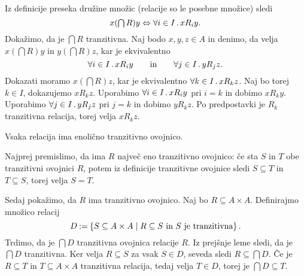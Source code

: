 \begin{dokaz}
  Iz definicije preseka družine množic (relacije so le posebne množice) sledi
  \begin{equation*}
  x (\textstyle\bigcap R) y \Leftrightarrow \forall i \in I \,.\, x R_i y.
  \end{equation*}
  Dokažimo, da je $\textstyle\bigcap R$ tranzitivna.
  Naj bodo $x, y, z \in A$ in denimo, da velja
  $x (\textstyle\bigcap R) y$ in $y (\textstyle\bigcap R) z$, kar je ekvivalentno
  \begin{equation*}
    \forall i \in I \,.\, x R_i y
    \qquad\text{in}\qquad
    \forall j \in I \,.\, y R_j z.
  \end{equation*}
  Dokazati moramo $x (\textstyle\bigcap R) z$, kar je ekvivalentno
  $\forall k \in I \,.\, x R_k z$.
  Naj bo torej $k \in I$, dokazujemo $x R_k z$. Uporabimo $\forall i \in I \,.\, x R_i y$ pri $i = k$ in dobimo $x R_k y$.
  Uporabimo $\forall j \in I \,.\, y R_j z$ pri $j = k$ in dobimo $y R_k z$.
  Po predpostavki je $R_k$ tranzitivna relacija, torej velja $x R_k z$.
\end{dokaz}

\begin{izrek}
  Vsaka relacija ima enolično tranzitivno ovojnico.
\end{izrek}

\begin{dokaz}
  Najprej premislimo, da ima $R$ največ eno tranzitivno ovojnico: če sta
  $S$ in $T$ obe tranzitivni ovojnici $R$, potem iz definicije tranzitivne ovojnice
  sledi $S \subseteq T$ in $T \subseteq S$, torej velja $S = T$.

  Sedaj pokažimo, da $R$ ima tranzitivno ovojnico. Naj bo $R \subseteq A \times A$. Definirajmo množico relacij
  \begin{equation*}
    D \mathbin{{:}{=}} \left\{ S \subseteq A \times A \; \middle| \; \text{$R \subseteq S$ in $S$ je tranzitivna} \right\}.
  \end{equation*}
  Trdimo, da je $\textstyle\bigcap D$ tranzitivna ovojnica relacije $R$.
  Iz prejšnje leme sledi, da je $\textstyle\bigcap D$ tranzitivna.
  Ker velja $R \subseteq S$ za vsak $S \in D$, seveda sledi $R \subseteq \textstyle\bigcap D$.
  Če je $R \subseteq T$ in $T \subseteq A \times A$ tranzitivna relacija, tedaj velja $T \in D$, torej je $\bigcap D \subseteq T$.
\end{dokaz}


